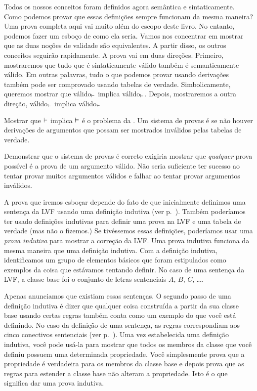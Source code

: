 Todos os nossos conceitos foram definidos agora sem\^antica e sintaticamente. Como podemos provar que essas defini\c c\~oes sempre funcionam da mesma maneira? Uma prova completa aqui vai muito al\'em do escopo deste livro. No entanto, podemos fazer um esbo\c co de como ela seria. Vamos nos concentrar em mostrar que as duas no\c c\~oes de validade s\~ao equivalentes. A partir disso, os outros conceitos seguir\~ao rapidamente. A prova vai em duas dire\c c\~oes. Primeiro,  mostraremos que tudo que \'e sintaticamente v\'alido tamb\'em \'e semanticamente v\'alido. Em outras palavras, tudo o que podemos provar usando deriva\c c\~oes tamb\'em pode ser comprovado usando tabelas de verdade. Simbolicamente,  queremos mostrar que  v\'alido$_{\vdash}$ implica v\'alido$_{\vDash}$. Depois, mostraremos a outra  dire\c c\~ao, v\'alido$_{\vDash}$ implica v\'alido$_{\vdash}$

  

Mostrar que $\vdash $ implica  $\vDash $  \'e  o problema da . \label{def:soundness} Um sistema de provas \'e   se n\~ao houver deriva\c c\~oes de argumentos que possam ser mostrados inv\'alidos pelas tabelas de verdade. 
 \label{def_Soundness} 

Demonstrar que o sistema de provas \'e correto exigiria mostrar que  \emph{qualquer} prova poss\'ivel \'e a prova de um argumento v\'alido. N\~ao seria suficiente ter sucesso ao tentar provar muitos argumentos v\'alidos e falhar ao tentar provar argumentos inv\'alidos.

A prova que iremos esbo\c car depende do fato de que inicialmente definimos uma senten\c ca da LVF usando uma defini\c c\~ao indutiva (ver p.~\pageref{TFLsentences}). Tamb\'em poder\'iamos ter usado defini\c c\~oes indutivas para definir uma prova na LVF e uma tabela de verdade (mas n\~ao o fizemos.)  Se tiv\'essemos essas defini\c c\~oes, poder\'iamos usar uma \emph{prova indutiva} para mostrar a corre\c c\~ao da LVF. Uma prova indutiva funciona da mesma maneira que uma defini\c c\~ao indutiva. Com a defini\c c\~ao indutiva, identificamos um grupo de elementos b\'asicos que foram estipulados como exemplos da coisa que est\'avamos tentando definir. No caso de uma senten\c ca da LVF, a classe base foi o conjunto de letras sentenciais $A$, $B$, $C$, \dots. 

Apenas anunciamos que existiam essas senten\c cas. O segundo passo de uma defini\c c\~ao indutiva \'e dizer que qualquer coisa constru\'ida a partir da sua classe base usando certas regras tamb\'em conta como um exemplo do que voc\^e est\'a definindo. No caso da defini\c c\~ao de uma senten\c ca, as regras correspondiam aos cinco conectivos sentenciais (ver  p.~\pageref{TFLsentences}). Uma vez  estabelecida uma defini\c c\~ao indutiva, voc\^e pode us\'a-la para mostrar que todos os membros da classe que voc\^e definiu possuem uma determinada propriedade. Voc\^e simplesmente prova que a propriedade \'e verdadeira para os membros da classe base e depois prova que as regras para estender a classe base n\~ao alteram a propriedade. Isto \'e o que significa dar uma prova indutiva.
 
